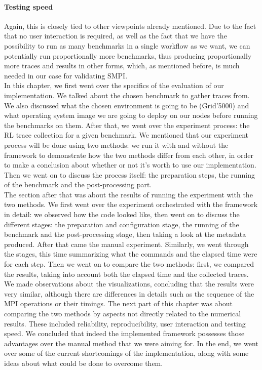 \paragraph{Testing speed}
Again, this is closely tied to other viewpoints already mentioned. Due
to the fact that no user interaction is required, as well as the fact
that we have the possibility to run as many benchmarks in a single
workflow as we want, we can potentially run proportionally more
benchmarks, thus producing proportionally more traces and results in
other forms, which, as mentioned before, is much needed in our case
for validating SMPI.\\[0.5cm]
In this chapter, we first went over the specifics of the evaluation of
our implementation. We talked about the chosen benchmark to
gather traces from. We also discussed what the chosen
environment is going to be (Grid'5000) and what operating system image
we are going to deploy on our nodes before running the benchmarks on
them. After that, we went over the experiment process: the RL trace
collection for a given benchmark. We mentioned that our experiment
process will be done using two methods: we run it with and without the
framework to demonstrate how the two methods differ from each
other, in order to make a conclusion about whether or not it's worth
to use our implementation. Then we went on to discuss the process
itself: the preparation steps, the running of the benchmark and the
post-processing part.\\[0.3cm]
The section after that was about the results of running the
experiment with the two methods. We first went over the experiment
orchestrated with the framework in detail: we observed how the code
looked like, then went on to discuss the different stages: the
preparation and configuration stage, the running of the benchmark and
the post-processing stage, then taking a look at the metadata
produced. After that came the manual experiment. Similarly, we went
through the stages, this time summarizing what the commands and the
elapsed time were for each step. Then we went on to compare the two
methods: first, we compared the results, taking into account both the
elapsed time and the collected traces. We made observations about the
visualizations, concluding that the results were very similar,
although there are differences in details such as the sequence of the
MPI operations or their timings. The next part of this chapter was
about comparing the two methods by aspects not directly related to the
numerical results. These included reliability, reproducibility, user
interaction and testing speed. We concluded that indeed the
implemented framework possesses those advantages over the manual
method that we were aiming for. In the end, we went over some of the
current shortcomings of the implementation, along with some ideas
about what could be done to overcome them.
